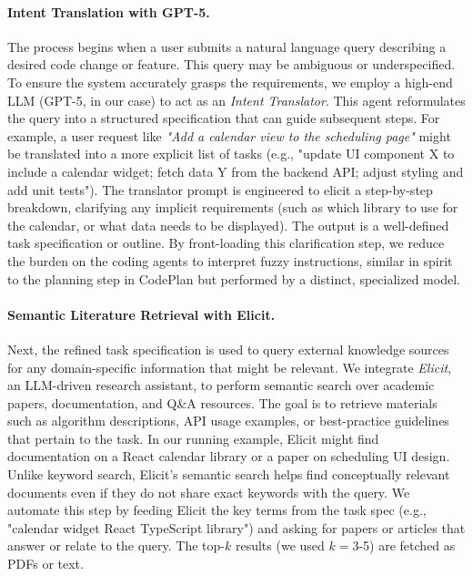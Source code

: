 \documentclass[11pt]{article}
\begin{document}
\paragraph{Intent Translation with GPT-5.} The process begins when a user submits a natural language query describing a desired code change or feature. This query may be ambiguous or underspecified. To ensure the system accurately grasps the requirements, we employ a high-end LLM (GPT-5, in our case) to act as an \emph{Intent Translator}. This agent reformulates the query into a structured specification that can guide subsequent steps. For example, a user request like \emph{"Add a calendar view to the scheduling page"} might be translated into a more explicit list of tasks (e.g., "update UI component X to include a calendar widget; fetch data Y from the backend API; adjust styling and add unit tests"). The translator prompt is engineered to elicit a step-by-step breakdown, clarifying any implicit requirements (such as which library to use for the calendar, or what data needs to be displayed). The output is a well-defined task specification or outline. By front-loading this clarification step, we reduce the burden on the coding agents to interpret fuzzy instructions, similar in spirit to the planning step in CodePlan but performed by a distinct, specialized model.

\paragraph{Semantic Literature Retrieval with Elicit.} Next, the refined task specification is used to query external knowledge sources for any domain-specific information that might be relevant. We integrate \emph{Elicit}, an LLM-driven research assistant, to perform semantic search over academic papers, documentation, and Q\&A resources. The goal is to retrieve materials such as algorithm descriptions, API usage examples, or best-practice guidelines that pertain to the task. In our running example, Elicit might find documentation on a React calendar library or a paper on scheduling UI design. Unlike keyword search, Elicit's semantic search helps find conceptually relevant documents even if they do not share exact keywords with the query. We automate this step by feeding Elicit the key terms from the task spec (e.g., "calendar widget React TypeScript library") and asking for papers or articles that answer or relate to the query. The top-$k$ results (we used $k=3$-5) are fetched as PDFs or text.
\end{document}
